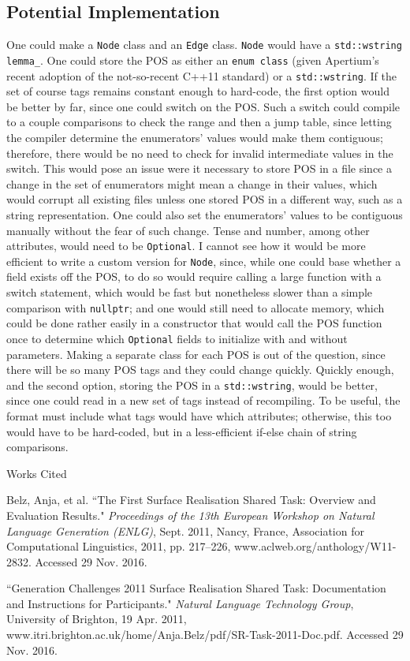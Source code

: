 \documentclass[12pt,letterpaper]{article}
\newenvironment{workscited}{
  \newcommand{\bibentry}{\noindent{}\hangindent=0.5in}
  \newpage{}
  {\centering{}Works Cited\par{}}
}{\newpage{}}
\begin{document}
\begin{flushleft}
  \subsection*{Potential Implementation} One could make a \texttt{Node} class and an \texttt{Edge} class. \texttt{Node} would have a \texttt{std::wstring lemma\_}. One could store the POS as either an \texttt{enum class} (given Apertium's recent adoption of the not-so-recent C++11 standard) or a \texttt{std::wstring}. If the set of course tags remains constant enough to hard-code, the first option would be better by far, since one could switch on the POS. Such a switch could compile to a couple comparisons to check the range and then a jump table, since letting the compiler determine the enumerators' values would make them contiguous; therefore, there would be no need to check for invalid intermediate values in the switch. This would pose an issue were it necessary to store POS in a file since a change in the set of enumerators might mean a change in their values, which would corrupt all existing files unless one stored POS in a different way, such as a string representation. One could also set the enumerators' values to be contiguous manually without the fear of such change. Tense and number, among other attributes, would need to be \texttt{Optional}. I cannot see how it would be more efficient to write a custom version for \texttt{Node}, since, while one could base whether a field exists off the POS, to do so would require calling a large function with a switch statement, which would be fast but nonetheless slower than a simple comparison with \texttt{nullptr}; and one would still need to allocate memory, which could be done rather easily in a constructor that would call the POS function once to determine which \texttt{Optional} fields to initialize with and without parameters. Making a separate class for each POS is out of the question, since there will be so many POS tags and they could change quickly. Quickly enough, and the second option, storing the POS in a \texttt{std::wstring}, would be better, since one could read in a new set of tags instead of recompiling. To be useful, the format must include what tags would have which attributes; otherwise, this too would have to be hard-coded, but in a less-efficient if-else chain of string comparisons.
  \begin{workscited}
    \bibentry{}Belz, Anja, et al. ``The First Surface Realisation Shared Task: Overview and Evaluation Results." \textit{Proceedings of the 13th European Workshop on Natural Language Generation (ENLG)}, Sept. 2011, Nancy, France, Association for Computational Linguistics, 2011, pp. 217--226, www.aclweb.org/anthology/W11-2832. Accessed 29 Nov. 2016.

    \bibentry{}``Generation Challenges 2011 Surface Realisation Shared Task: Documentation and Instructions for Participants." \textit{Natural Language Technology Group}, University of Brighton, 19 Apr. 2011, www.itri.brighton.ac.uk/home/Anja.Belz/pdf/SR-Task-2011-Doc.pdf. Accessed 29 Nov. 2016.
  \end{workscited}
\end{flushleft}
\end{document}

